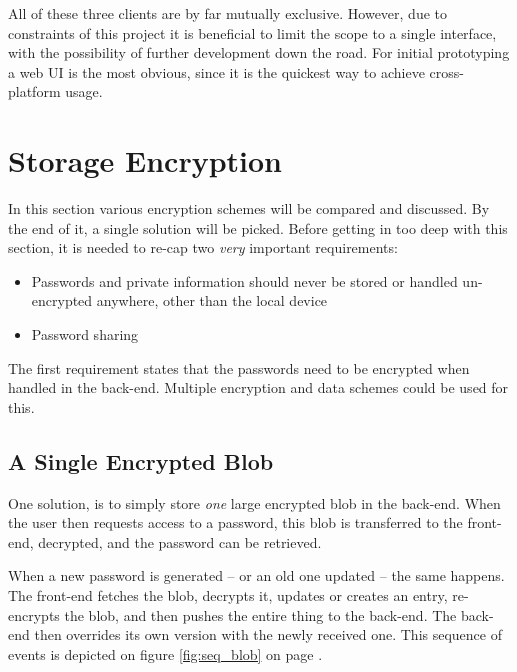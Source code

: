 		All of these three clients are by far mutually exclusive. However, due to constraints of this project it is beneficial to limit the scope to a single interface, with the possibility of further development down the road. For initial prototyping a web UI is the most obvious, since it is the quickest way to achieve cross-platform usage. 

	\section{Storage Encryption}
		In this section various encryption schemes will be compared and discussed. By the end of it, a single solution will be picked. Before getting in too deep with this section, it is needed to re-cap two \emph{very} important requirements:
		\begin{itemize}
			\item Passwords and private information should never be stored or handled un-encrypted anywhere, other than the local device
			\item Password sharing
		\end{itemize}

		The first requirement states that the passwords need to be encrypted when handled in the back-end. Multiple encryption and data schemes could be used for this.

		\subsection{A Single Encrypted Blob}
			One solution, is to simply store \emph{one} large encrypted blob in the back-end. When the user then requests access to a password, this blob is transferred to the front-end, decrypted, and the password can be retrieved. 

			When a new password is generated -- or an old one updated -- the same happens. The front-end fetches the blob, decrypts it, updates or creates an entry, re-encrypts the blob, and then pushes the entire thing to the back-end. The back-end then overrides its own version with the newly received one. This sequence of events is depicted on figure \ref{fig:seq_blob} on page \pageref{fig:seq_blob}.

